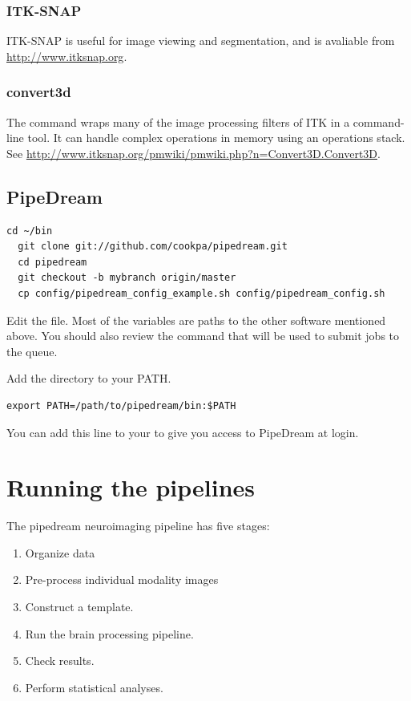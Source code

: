 \documentclass{InsightArticle}
\begin{document}
\subsubsection{ITK-SNAP}

ITK-SNAP is useful for image viewing and segmentation, and is avaliable from \url{http://www.itksnap.org}.

\subsubsection{convert3d}

The  command wraps many of the image processing filters of ITK in a command-line tool. It can handle complex operations in memory using an operations stack. See \url{http://www.itksnap.org/pmwiki/pmwiki.php?n=Convert3D.Convert3D}.


\subsection{PipeDream}

\begin{lstlisting}[style=bash]
  cd ~/bin
  git clone git://github.com/cookpa/pipedream.git
  cd pipedream
  git checkout -b mybranch origin/master
  cp config/pipedream_config_example.sh config/pipedream_config.sh
\end{lstlisting}

Edit the  file. Most of the variables are paths to the other software mentioned above. You should also review the  command that will be used to submit jobs to the queue. 

Add the  directory to your PATH.
\begin{lstlisting}[style=bash]
 export PATH=/path/to/pipedream/bin:$PATH
\end{lstlisting}
You can add this line to your  to give you access to PipeDream at login.
 

\section{Running the pipelines}

The pipedream neuroimaging pipeline has five stages: 
\begin{enumerate}
\item Organize data
\item Pre-process individual modality images
\item Construct a template.  
\item Run the brain processing pipeline.  
\item Check results. 
\item Perform statistical analyses.  
\end{enumerate}
\end{document}
